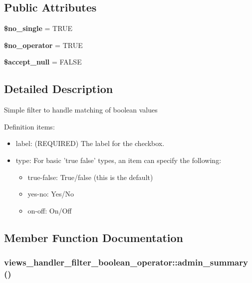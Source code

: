 \subsection*{Public Attributes}
\begin{CompactItemize}
\item 
\hypertarget{classviews__handler__filter__boolean__operator_ae28b192f48d74a49afd4aa2ed2daae0}{
\textbf{\$no\_\-single} = TRUE}
\label{classviews__handler__filter__boolean__operator_ae28b192f48d74a49afd4aa2ed2daae0}

\item 
\hypertarget{classviews__handler__filter__boolean__operator_0ad8e21c2f836e4ade02e9d0c458bc90}{
\textbf{\$no\_\-operator} = TRUE}
\label{classviews__handler__filter__boolean__operator_0ad8e21c2f836e4ade02e9d0c458bc90}

\item 
\hypertarget{classviews__handler__filter__boolean__operator_c6f1cd7c0c2f1108a4678651dd2e437b}{
\textbf{\$accept\_\-null} = FALSE}
\label{classviews__handler__filter__boolean__operator_c6f1cd7c0c2f1108a4678651dd2e437b}

\end{CompactItemize}


\subsection{Detailed Description}
Simple filter to handle matching of boolean values

Definition items:\begin{itemize}
\item label: (REQUIRED) The label for the checkbox.\item type: For basic 'true false' types, an item can specify the following:\begin{itemize}
\item true-false: True/false (this is the default)\item yes-no: Yes/No\item on-off: On/Off \end{itemize}
\end{itemize}


\subsection{Member Function Documentation}
\hypertarget{classviews__handler__filter__boolean__operator_7b58a9b58ae9778383b6a215834d7cdb}{
\subsubsection[{admin\_\-summary}]{\setlength{\rightskip}{0pt plus 5cm}views\_\-handler\_\-filter\_\-boolean\_\-operator::admin\_\-summary ()}}
\label{classviews__handler__filter__boolean__operator_7b58a9b58ae9778383b6a215834d7cdb}


